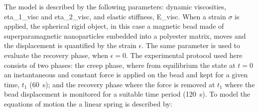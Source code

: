 The model is described by the following parameters: dynamic viscosities, \gls{eta_1_visc} and \gls{eta_2_visc}, and elastic stiffness, \gls{E_visc}.
When a strain \(\sigma \) is applied, the spherical rigid object, in this case a magnetic bead made of superparamagnetic nanoparticles embedded into a polyester matrix, moves and the displacement is quantified by the strain \(\epsilon \).
The same parameter is used to evaluate the recovery phase, when \(\epsilon = 0\).
The experimental protocol used here consists of two phases: the creep phase, where from equilibrium the state at \(t=0\) an instantaneous and constant force is applied on the bead and kept for a given time, \(t_1 \) (\SI{60}{\second}); and the recovery phase where the force is removed at \(t_1\) where the bead displacement is monitored for a suitable time period (\SI{120}{\second}).
To model the equations of motion the a linear spring is described by:

